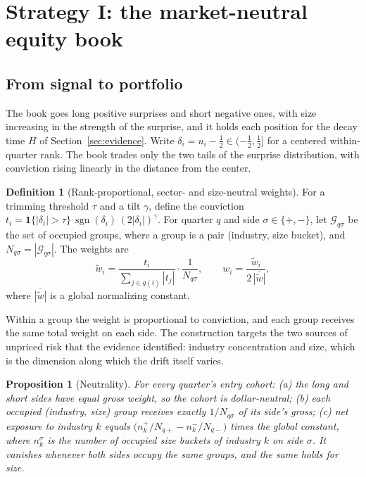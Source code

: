 \documentclass[11pt]{article}
\newtheorem{proposition}{Proposition}
\theoremstyle{definition}
\newtheorem{definition}{Definition}
\newcommand{\sgn}{\operatorname{sgn}}
\newcommand{\1}{\mathbf{1}}
\begin{document}
\section{Strategy I: the market-neutral equity book}\label{sec:equity}

\subsection{From signal to portfolio}

The book goes long positive surprises and short negative ones, with size increasing in the
strength of the surprise, and it holds each position for the decay time $H$ of
Section~\ref{sec:evidence}. Write $\delta_i=u_i-\tfrac12\in(-\tfrac12,\tfrac12]$ for a
centered within-quarter rank. The book trades only the two tails of the surprise
distribution, with conviction rising linearly in the distance from the center.

\begin{definition}[Rank-proportional, sector- and size-neutral weights]\label{def:weights}
For a trimming threshold $\tau$ and a tilt $\gamma$, define the conviction
$t_i=\1\{|\delta_i|>\tau\}\,\sgn(\delta_i)\,(2|\delta_i|)^{\gamma}$. For quarter $q$ and side
$\sigma\in\{+,-\}$, let $\mathcal{G}_{q\sigma}$ be the set of occupied groups, where a group
is a pair (industry, size bucket), and $N_{q\sigma}=|\mathcal G_{q\sigma}|$. The weights are
\begin{equation}
  \tilde w_i=\frac{t_i}{\sum_{j\in g(i)}|t_j|}\cdot\frac{1}{N_{q\sigma}},\qquad
  w_i=\frac{\tilde w_i}{2\,\overline{|\tilde w|}},
  \label{eq:weights}
\end{equation}
where $\overline{|\tilde w|}$ is a global normalizing constant.
\end{definition}

Within a group the weight is proportional to conviction, and each group receives the same
total weight on each side. The construction targets the two sources of unpriced risk that
the evidence identified: industry concentration and size, which is the dimension along
which the drift itself varies.

\begin{proposition}[Neutrality]\label{prop:neutral}
For every quarter's entry cohort:
(a) the long and short sides have equal gross weight, so the cohort is dollar-neutral;
(b) each occupied (industry, size) group receives exactly $1/N_{q\sigma}$ of its side's gross;
(c) net exposure to industry $k$ equals $\big(n^{+}_{k}/N_{q+}-n^{-}_{k}/N_{q-}\big)$ times
the global constant, where $n^\sigma_k$ is the number of occupied size buckets of industry $k$
on side $\sigma$. It vanishes whenever both sides occupy the same groups, and the same holds
for size.
\end{proposition}
\end{document}
